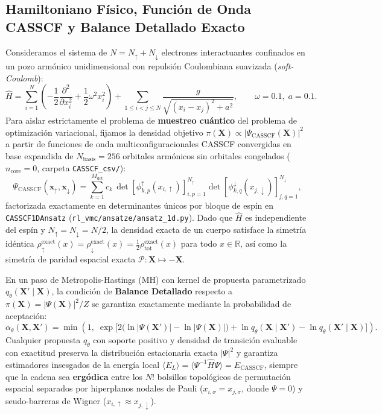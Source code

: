 \documentclass[10pt,a4paper]{article}
\begin{document}
\subsection{Hamiltoniano Físico, Función de Onda CASSCF y Balance Detallado Exacto}

Consideramos el sistema de $N = N_\uparrow + N_\downarrow$ electrones interactuantes confinados en un pozo armónico unidimensional con repulsión Coulombiana suavizada (\textit{soft-Coulomb}):
\begin{equation}
\hat{H} = \sum_{i=1}^{N} \left( -\frac{1}{2}\frac{\partial^2}{\partial x_i^2} + \frac{1}{2}\omega^2 x_i^2 \right) + \sum_{1 \le i < j \le N} \frac{g}{\sqrt{(x_i - x_j)^2 + a^2}}, \qquad \omega = 0.1,\; a = 0.1.
\label{eq:hamiltonian}
\end{equation}
Para aislar estrictamente el problema de \textbf{muestreo cuántico} del problema de optimización variacional, fijamos la densidad objetivo $\pi(\bm{X}) \propto |\Psi_{\mathrm{CASSCF}}(\bm{X})|^2$ a partir de funciones de onda multiconfiguracionales CASSCF convergidas en base expandida de $N_{\mathrm{basis}} = 256$ orbitales armónicos sin orbitales congelados ($n_{\mathrm{core}} = 0$, carpeta \texttt{CASSCF\_csv/}):
\begin{equation}
\Psi_{\mathrm{CASSCF}}(\bm{x}_\uparrow, \bm{x}_\downarrow) = \sum_{k=1}^{M_{\mathrm{det}}} c_k \, \det\!\left[\phi_{k,p}^\uparrow(x_{i,\uparrow})\right]_{i,p=1}^{N_\uparrow} \det\!\left[\phi_{k,q}^\downarrow(x_{j,\downarrow})\right]_{j,q=1}^{N_\downarrow},
\label{eq:casscf}
\end{equation}
factorizada exactamente en determinantes únicos por bloque de espín en \texttt{CASSCF1DAnsatz} (\texttt{rl\_vmc/ansatze/ansatz\_1d.py}). Dado que $\hat{H}$ es independiente del espín y $N_\uparrow = N_\downarrow = N/2$, la densidad exacta de un cuerpo satisface la simetría idéntica $\rho_\uparrow^{\mathrm{exact}}(x) = \rho_\downarrow^{\mathrm{exact}}(x) = \frac{1}{2}\rho_{\mathrm{tot}}^{\mathrm{exact}}(x)$ para todo $x \in \mathbb{R}$, así como la simetría de paridad espacial exacta $\mathcal{P}: \bm{X} \mapsto -\bm{X}$.

En un paso de Metropolis-Hastings (MH) con kernel de propuesta parametrizado $q_\theta(\bm{X}' \mid \bm{X})$, la condición de \textbf{Balance Detallado} respecto a $\pi(\bm{X}) = |\Psi(\bm{X})|^2 / Z$ se garantiza exactamente mediante la probabilidad de aceptación:
\begin{equation}
\alpha_\theta(\bm{X}, \bm{X}') = \min\!\left(1,\; \exp\!\Big[2\big(\ln|\Psi(\bm{X}')| - \ln|\Psi(\bm{X})|\big) + \ln q_\theta(\bm{X} \mid \bm{X}') - \ln q_\theta(\bm{X}' \mid \bm{X})\Big]\right).
\label{eq:mh_alpha}
\end{equation}
Cualquier propuesta $q_\theta$ con soporte positivo y densidad de transición evaluable con exactitud preserva la distribución estacionaria exacta $|\Psi|^2$ y garantiza estimadores insesgados de la energía local $\langle E_L \rangle = \langle \Psi^{-1}\hat{H}\Psi \rangle = E_{\mathrm{CASSCF}}$, siempre que la cadena sea \textbf{ergódica} entre los $N!$ bolsillos topológicos de permutación espacial separados por hiperplanos nodales de Pauli ($x_{i,\sigma} = x_{j,\sigma}$, donde $\Psi = 0$) y seudo-barreras de Wigner ($x_{i,\uparrow} \approx x_{j,\downarrow}$).
\end{document}
